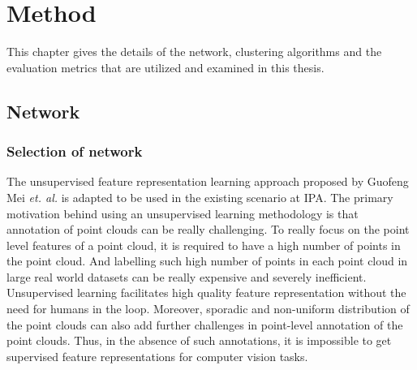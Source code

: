\section{Method}
\label{sec:method}
This chapter gives the details of the network, clustering algorithms and the evaluation metrics that are utilized and examined in this thesis. 
\subsection{Network}
\subsubsection{Selection of network}
The unsupervised feature representation learning approach proposed by Guofeng Mei \textit{et. al.}\cite{mei2022unsupervised} is adapted to be used in the existing scenario at \ac{IPA}. The primary motivation behind using an unsupervised learning  methodology is that annotation of point clouds can be really challenging. To really focus on the point level features of a point cloud, it is required to have a high number of points in the point cloud. And labelling such high number of points in each point cloud in large real world datasets can be really expensive and severely inefficient. Unsupervised learning facilitates high quality feature representation without the need for humans in the loop. Moreover, sporadic and non-uniform distribution of the point clouds can also add further challenges in point-level annotation of the point clouds. Thus, in the absence of such annotations, it is impossible to get supervised feature representations for computer vision tasks.\cite{mei2022unsupervised} 

\vspace{5 mm}


